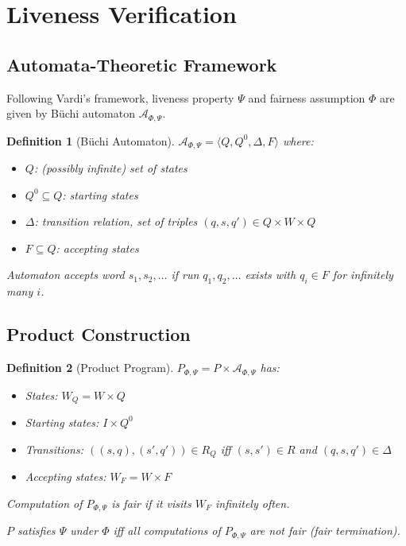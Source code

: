 \documentclass{article}
\newtheorem{definition}{Definition}
\begin{document}
\section{Liveness Verification}

\subsection{Automata-Theoretic Framework}

Following Vardi's framework, liveness property $\Psi$ and fairness assumption $\Phi$ are given by Büchi automaton $\mathcal{A}_{\Phi,\Psi}$.

\begin{definition}[Büchi Automaton]
$\mathcal{A}_{\Phi,\Psi} = \langle Q, Q^0, \Delta, F \rangle$ where:
\begin{itemize}
    \item $Q$: (possibly infinite) set of states
    \item $Q^0 \subseteq Q$: starting states
    \item $\Delta$: transition relation, set of triples $(q, s, q') \in Q \times W \times Q$
    \item $F \subseteq Q$: accepting states
\end{itemize}

Automaton accepts word $s_1, s_2, \ldots$ if run $q_1, q_2, \ldots$ exists with $q_i \in F$ for infinitely many $i$.
\end{definition}

\subsection{Product Construction}

\begin{definition}[Product Program]
$P_{\Phi,\Psi} = P \times \mathcal{A}_{\Phi,\Psi}$ has:
\begin{itemize}
    \item States: $W_Q = W \times Q$
    \item Starting states: $I \times Q^0$
    \item Transitions: $((s, q), (s', q')) \in R_Q$ iff $(s, s') \in R$ and $(q, s, q') \in \Delta$
    \item Accepting states: $W_F = W \times F$
\end{itemize}

Computation of $P_{\Phi,\Psi}$ is \emph{fair} if it visits $W_F$ infinitely often.

$P$ satisfies $\Psi$ under $\Phi$ iff all computations of $P_{\Phi,\Psi}$ are not fair (fair termination).
\end{definition}
\end{document}
